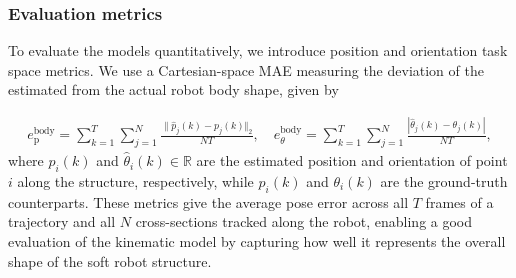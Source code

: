 
\subsubsection{Evaluation metrics}
To evaluate the models quantitatively, we introduce position and orientation task space metrics. 
We use a Cartesian-space \gls{MAE} measuring the deviation of the estimated from the actual robot body shape, given by

\begin{equation}
\begin{split}
     e_\mathrm{p}^{\mathrm{body}} = \sum_{k=1}^T \sum_{j=1}^N \frac{\lVert \hat{p}_j(k) - p_j(k) \Vert_2}{N T},
     \quad
    e_{\theta}^{\mathrm{body}} = \sum_{k=1}^T \sum_{j=1}^N \frac{| \hat{\theta}_j(k) - \theta_j(k) |}{N T},
\end{split}
\end{equation}
where 
$\hat{p}_i(k)$ and $\hat{\theta}_i(k) \in \mathbb{R}$ are the estimated position and orientation of point $i$ along the structure, respectively, while $p_i(k)$ and $\theta_i(k)$ are the ground-truth counterparts. These metrics give the average pose error across all $T$ frames of a trajectory and all $N$ cross-sections tracked along the robot, enabling a good evaluation of the kinematic model by capturing how well it represents the overall shape of the soft robot structure.

